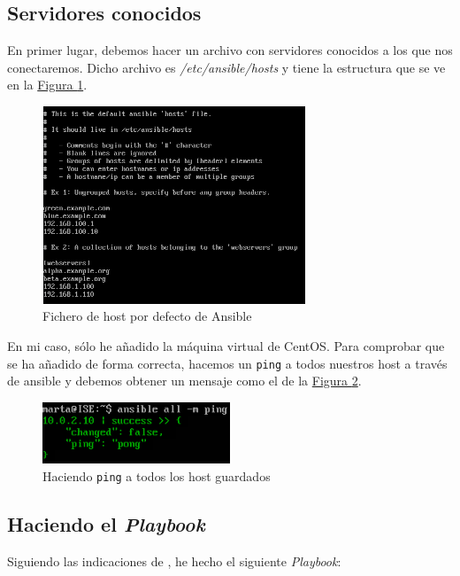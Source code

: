 \documentclass[10pt,a4paper,spanish]{article}
\numberwithin{equation}{section} %
\numberwithin{figure}{section} %
\numberwithin{table}{section} %
\begin{document}
\subsection{Servidores conocidos}
En primer lugar, debemos hacer un archivo con servidores conocidos a los que nos conectaremos. Dicho archivo es \textit{/etc/ansible/hosts} y tiene la estructura que se ve en la \hyperref[hostansi]{Figura \ref*{hostansi}}.

\begin{figure}[!h]
    \centering
    \includegraphics[width=0.7\textwidth]{45}
    \caption{Fichero de host por defecto de Ansible}
    \label{hostansi}
\end{figure}

En mi caso, sólo he añadido la máquina virtual de CentOS. Para comprobar que se ha añadido de forma correcta, hacemos un \texttt{ping} a todos nuestros host a través de ansible y debemos obtener un mensaje como el de la \hyperref[pingpong]{Figura \ref*{pingpong}}.

\begin{figure}[!h]
    \centering
    \includegraphics[width=0.5\textwidth]{46}
    \caption{Haciendo \texttt{ping} a todos los host guardados}
    \label{pingpong}
\end{figure}

\subsection{Haciendo el \textit{Playbook}}
Siguiendo las indicaciones de \cite{playbook}, he hecho el siguiente \textit{Playbook}:
\end{document}
